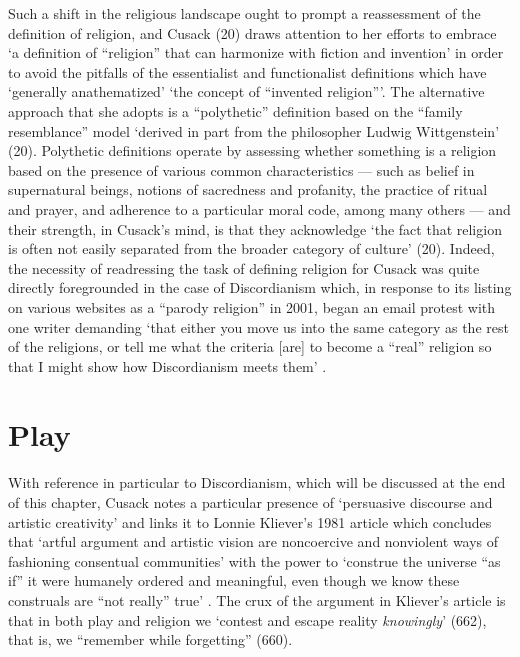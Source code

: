 \documentclass[Draft.tex]{subfiles}
\begin{document}
Such a shift in the religious landscape ought to prompt a reassessment of
the definition of religion, and Cusack (20) draws attention to her efforts to
embrace `a definition of ``religion'' that can
harmonize with fiction and invention' in order to avoid the pitfalls
of the essentialist and functionalist definitions
which have `generally anathematized'
`the concept of ``invented religion''\thinspace'.
The alternative approach that she adopts is a ``polythetic'' definition
based on the ``family resemblance'' model `derived in part from the philosopher
Ludwig Wittgenstein' (20).
Polythetic definitions operate by assessing whether something is a religion
based on the presence of various common characteristics --- such as
belief in supernatural beings, notions of sacredness and profanity,
the practice of ritual and prayer, and adherence to a particular moral code,
among many others --- and their strength, in Cusack's mind, is that
they acknowledge `the fact that religion is often not easily separated from
the broader category of culture' (20).
Indeed, the necessity of readressing the task of defining religion for Cusack
was quite directly foregrounded in the case of Discordianism which,
in response to its listing on various websites as a ``parody religion''
in 2001, began an email protest with one writer demanding
`that either you move us into the same category
as the rest of the religions, or tell me what the criteria [are]
to become a ``real'' religion so that I might show
how Discordianism meets them' \parencite[209]{Chidester05}.


\section*{Play}
With reference in particular to Discordianism,
which will be discussed at the end of this chapter,
Cusack \parencite*[23]{Cusack10} notes a particular presence of
`persuasive discourse and artistic creativity' and links it to
Lonnie Kliever's 1981 article which concludes that
`artful argument and artistic vision are noncoercive and nonviolent ways
of fashioning consentual communities' with the power to
`construe the universe ``as if'' it were humanely ordered and meaningful,
even though we know these construals are
``not really'' true' \parencite[665]{Kliever81}.
The crux of the argument in Kliever's article is that
in both play and religion we
`contest and escape reality \textit{knowingly}' (662),
that is, we ``remember while forgetting'' (660).
\end{document}
